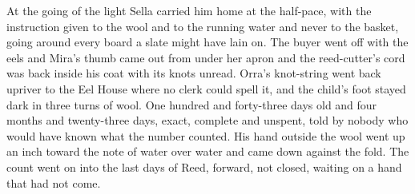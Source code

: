 At the going of the light Sella carried him home at the half-pace, with the instruction given to the wool and to the running water and never to the basket, going around every board a slate might have lain on. The buyer went off with the eels and Mira's thumb came out from under her apron and the reed-cutter's cord was back inside his coat with its knots unread. Orra's knot-string went back upriver to the Eel House where no clerk could spell it, and the child's foot stayed dark in three turns of wool. One hundred and forty-three days old and four months and twenty-three days, exact, complete and unspent, told by nobody who would have known what the number counted. His hand outside the wool went up an inch toward the note of water over water and came down against the fold. The count went on into the last days of Reed, forward, not closed, waiting on a hand that had not come.
